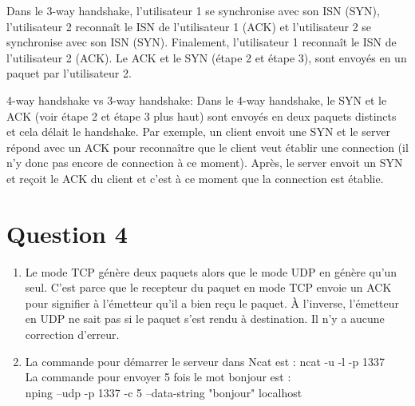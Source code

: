 \vspace{5mm} %
Dans le 3-way handshake, l’utilisateur 1 se synchronise avec  son ISN (SYN), l’utilisateur 2 reconnaît le ISN de l’utilisateur 1 (ACK) et l’utilisateur 2 se synchronise avec son ISN (SYN). Finalement, l’utilisateur 1 reconnaît le ISN de l’utilisateur 2 (ACK). Le ACK et le SYN (étape 2 et étape 3), sont envoyés en un paquet par l’utilisateur 2.
\vspace{5mm} %
\vspace{5mm} %

4-way handshake vs 3-way handshake:
Dans le 4-way handshake, le SYN et le ACK (voir étape 2 et étape 3 plus haut) sont envoyés en deux paquets distincts et cela délait le handshake. Par exemple, un client envoit une SYN et le server répond avec un ACK pour reconnaître que le client veut établir une connection (il n’y donc pas encore de connection à ce moment). Après, le server envoit un SYN et reçoit le ACK du client et c’est à ce moment que la connection est établie.

\section{Question 4}
\begin{enumerate}
	\item Le mode TCP génère deux paquets alors que le mode UDP en génère qu'un seul. C'est parce que le recepteur du paquet en mode TCP envoie un ACK pour signifier à l'émetteur qu'il a bien reçu le paquet. À l'inverse, l'émetteur en UDP ne sait pas si le paquet s'est rendu à destination. Il n'y a aucune correction d'erreur.
	\item La commande pour démarrer le serveur dans Ncat est : ncat -u -l -p 1337 \\ La commande pour envoyer 5 fois le mot bonjour est : \\ nping --udp -p 1337 -c 5 --data-string "bonjour" localhost
\end{enumerate}

